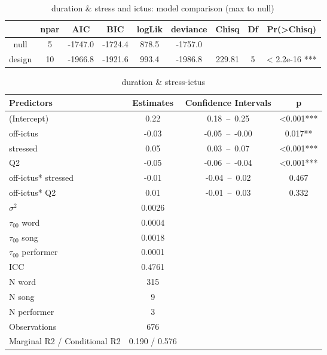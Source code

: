 \begin{table}[htb]
\caption{duration \& stress and ictus: model comparison (max to null) }
\begin{center}
\centering
\begin{tabular}{|ccccccccc|}
\hline
      & npar   &  AIC   &  BIC & logLik & deviance  & Chisq & Df & Pr(>Chisq)    \\
\hline
\hline
null &   5& -1747.0 &-1724.4  &878.5 & -1757.0         && \\            
design &   10& -1966.8& -1921.6  &993.4  &-1986.8 & 229.81&  5 & < 2.2e-16 ***\\
\hline

\end{tabular}
\end{center}
\label{durstrickmdls}
\end{table}%

%
%





\begin{table}[htb]
\caption{duration \& stress-ictus}
\begin{center}
\begin{tabular}{|l|c|c|c|}
\hline
\hline
Predictors	&	Estimates	&	Confidence Intervals	&	p	\\
\hline
(Intercept)	&	0.22	&	0.18 – 0.25	&	<0.001***	\\
off-ictus	&	-0.03	&	-0.05 – -0.00	&	0.017**	\\
stressed	&	0.05	&	0.03 – 0.07	&	<0.001***	\\
Q2&	-0.05	&	-0.06 – -0.04	&	<0.001***	\\
off-ictus* stressed	&	-0.01	&	-0.04 – 0.02	&	0.467	\\
off-ictus* Q2	&	0.01	&	-0.01 – 0.03	&	0.332	\\
\hline
\hline
$\sigma^2$ 	&	0.0026	&&	\\
$\tau_{00}$ word	&	0.0004	&&	\\
$\tau_{00}$ song	&	0.0018		&&	\\
$\tau_{00}$ performer	&	0.0001		&&\\
ICC	&	0.4761	&&	\\
\hline
\hline
N word	&	315		&&	\\
N song	&	9		&&	\\
N performer	&	3	&&	\\
Observations	&	676	&&	\\
Marginal R2 / Conditional R2	&	0.190 / 0.576	&&\\
\hline
\end{tabular}
\end{center}
\label{durlmerrando}
\end{table}%

